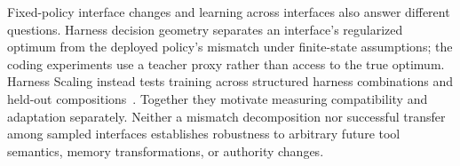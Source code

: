 Fixed-policy interface changes and learning across interfaces also answer different questions. Harness decision geometry separates an interface's regularized optimum from the deployed policy's mismatch under finite-state assumptions; the coding experiments use a teacher proxy rather than access to the true optimum. Harness Scaling instead tests training across structured harness combinations and held-out compositions~\cite{ch01_harnessgeometry2026,ch01_harnessscaling2026}. Together they motivate measuring compatibility and adaptation separately. Neither a mismatch decomposition nor successful transfer among sampled interfaces establishes robustness to arbitrary future tool semantics, memory transformations, or authority changes.

